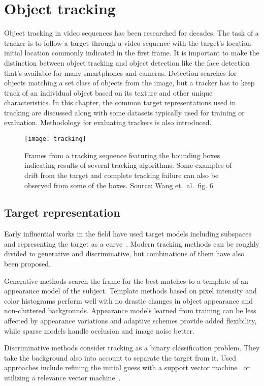 \section{Object tracking}
Object tracking in video sequences has been researched for decades. The task of a
tracker is to follow a target through a video sequence with the target's location
initial location commonly indicated in the first frame. It is important to make the
distinction between object tracking and object detection like the face detection that's
available for many smartphones and cameras. Detection searches for objects matching
a set class of objects from the image, but a tracker has to keep track of an individual
object based on its texture and other unique characteristics. In this chapter, the
common target representations used in tracking are discussed along with some datasets
typically used for training or evaluation. Methodology for evaluating trackers is also
introduced.

\begin{figure}[H]
\centering
\texttt{[image: tracking]}
\caption{Frames from a tracking sequence featuring the bounding boxes indicating results
         of several tracking algorithms. Some examples of drift from the target and
         complete tracking failure can also be observed from some of the boxes.
         Source: Wang et.~al.~fig. 6~\cite{OBJECT_PLS}}\label{fig:tracking}
\end{figure}

\subsection{Target representation}
Early influential works in the field have used target models including subspaces
~\cite{EIGENTRACK} and representing the target as a curve~\cite{CONDENSATION}. Modern
tracking methods can be roughly divided to generative and discriminative, but combinations
of them have also been proposed.~\cite{DLT}

Generative methods search the frame for the best matches to a template of an appearance
model of the subject. Template methods based on pixel intensity and color histograms
perform well with no drastic changes in object appearance and non-cluttered backgrounds.
Appearance models learned from training can be less affected by appearance variations
and adaptive schemes provide added flexibility, while sparse models handle occlusion
and image noise better.~\cite{OBJECT_PLS}

Discriminative methods consider tracking as a binary classification problem. They take
the background also into account to separate the target from it. Used approaches
include refining the initial guess with a support vector machine~\cite{SVT} or utilizing
a relevance vector machine~\cite{SPARSE_BAYESIAN}.


